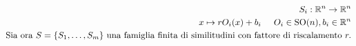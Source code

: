 \documentclass[preview]{standalone}
\begin{document}
\begin{align*}
S_i : \mathbb{R}^n \to \mathbb{R}^n \\ x \mapsto r O_i(x) + b_i\hspace{0.5 cm} O_i \in \text{SO}(n), b_i \in \mathbb{R}^n \\  \text{Sia ora }S = \{S_1, \dots, S_m\} \text{ una famiglia finita di similitudini con fattore di riscalamento } r.
\end{align*}
\end{document}
